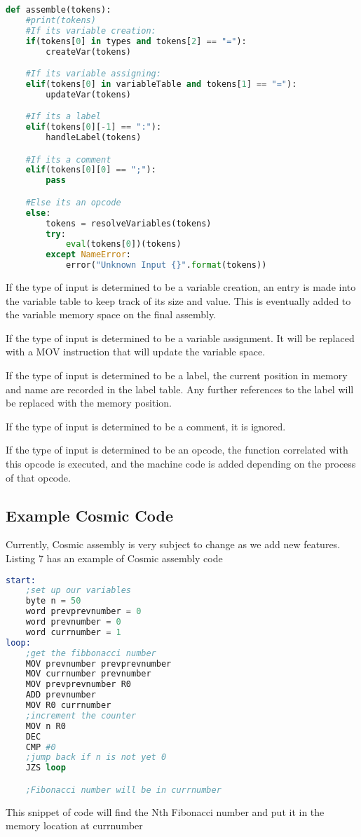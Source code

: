 \documentclass[conference]{IEEEtran}
\begin{document}
\begin{lstlisting}[language=Python, caption=Assembler Logic]
def assemble(tokens):
    #print(tokens)
    #If its variable creation:
    if(tokens[0] in types and tokens[2] == "="):
        createVar(tokens)

    #If its variable assigning:
    elif(tokens[0] in variableTable and tokens[1] == "="):
        updateVar(tokens)

    #If its a label
    elif(tokens[0][-1] == ":"):
        handleLabel(tokens)

    #If its a comment
    elif(tokens[0][0] == ";"):
        pass

    #Else its an opcode
    else: 
        tokens = resolveVariables(tokens)
        try:
            eval(tokens[0])(tokens)
        except NameError:
            error("Unknown Input {}".format(tokens))
\end{lstlisting}

If the type of input is determined to be a variable creation, an entry is made into the variable table to keep track of its size and value. This is eventually added to the variable memory space on the final assembly.

If the type of input is determined to be a variable assignment. It will be replaced with a MOV instruction that will update the variable space. 

If the type of input is determined to be a label, the current position in memory and name are recorded in the label table. Any further references to the label will be replaced with the memory position.

If the type of input is determined to be a comment, it is ignored.

If the type of input is determined to be an opcode, the function correlated with this opcode is executed, and the machine code is added depending on the process of that opcode. 


\subsection{Example Cosmic Code}
Currently, Cosmic assembly is very subject to change as we add new features. Listing 7 has an example of Cosmic assembly code

\begin{lstlisting}[language=Assembler, caption=Cosmic Assembly to find the Nth Fibonacci Number]
start:
    ;set up our variables
    byte n = 50
    word prevprevnumber = 0
    word prevnumber = 0
    word currnumber = 1
loop:
    ;get the fibbonacci number
    MOV prevnumber prevprevnumber
    MOV currnumber prevnumber
    MOV prevprevnumber R0
    ADD prevnumber
    MOV R0 currnumber
    ;increment the counter
    MOV n R0
    DEC
    CMP #0
    ;jump back if n is not yet 0
    JZS loop

    ;Fibonacci number will be in currnumber
\end{lstlisting}

This snippet of code will find the Nth Fibonacci number and put it in the memory location at currnumber
\end{document}
